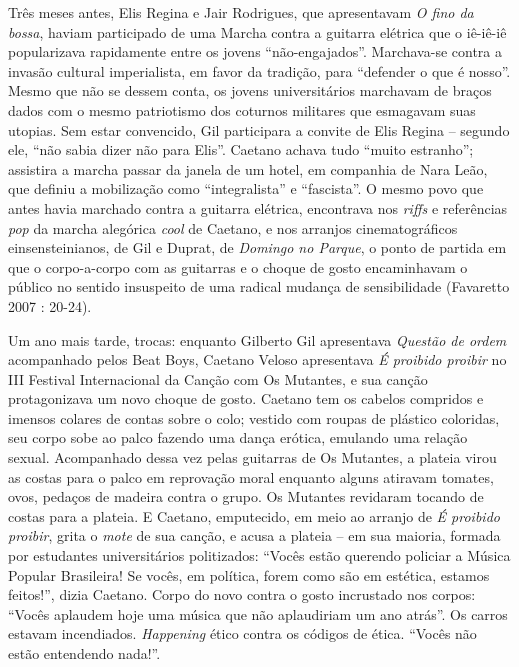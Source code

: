 Três meses antes, Elis Regina e Jair Rodrigues, que apresentavam \emph{O
fino da bossa}, haviam participado de uma Marcha contra a guitarra
elétrica que o iê-iê-iê popularizava rapidamente entre os jovens
``não-engajados''. Marchava-se contra a invasão cultural imperialista,
em favor da tradição, para ``defender o que é nosso''. Mesmo que não se
dessem conta, os jovens universitários marchavam de braços dados com o
mesmo patriotismo dos coturnos militares que esmagavam suas utopias. Sem
estar convencido, Gil participara a convite de Elis Regina -- segundo
ele, ``não sabia dizer não para Elis''. Caetano achava tudo ``muito
estranho''; assistira a marcha passar da janela de um hotel, em
companhia de Nara Leão, que definiu a mobilização como ``integralista''
e ``fascista''. O mesmo povo que antes havia marchado contra a guitarra
elétrica, encontrava nos \emph{riffs }e referências \emph{pop} da marcha
alegórica \emph{cool }de Caetano, e nos arranjos cinematográficos
einsensteinianos, de Gil e Duprat, de \emph{Domingo no Parque},\emph{ }o
ponto de partida em que o corpo-a-corpo com as guitarras e o choque de
gosto encaminhavam o público no sentido insuspeito de uma radical
mudança de sensibilidade (Favaretto 2007 : 20-24).

Um ano mais tarde, trocas: enquanto Gilberto Gil apresentava
\emph{Questão de ordem }acompanhado pelos Beat Boys, Caetano\emph{
}Veloso apresentava \emph{É proibido proibir} no III Festival
Internacional da Canção com Os Mutantes, e sua canção protagonizava um
novo choque de gosto. Caetano tem os cabelos compridos e imensos colares
de contas sobre o colo; vestido com roupas de plástico coloridas, seu
corpo sobe ao palco fazendo uma dança erótica, emulando uma relação
sexual. Acompanhado dessa vez pelas guitarras de Os Mutantes, a plateia
virou as costas para o palco em reprovação moral enquanto alguns
atiravam tomates, ovos, pedaços de madeira contra o grupo. Os Mutantes
revidaram tocando de costas para a plateia. E Caetano, emputecido, em
meio ao arranjo de \emph{É proibido proibir}, grita o \emph{mote }de sua
canção, e acusa a plateia -- em sua maioria, formada por estudantes
universitários politizados: ``Vocês estão querendo policiar a Música
Popular Brasileira! Se vocês, em política, forem como são em estética,
estamos feitos!'', dizia Caetano. Corpo do novo contra o gosto
incrustado nos corpos: ``Vocês aplaudem hoje uma música que não
aplaudiriam um ano atrás''. Os carros estavam incendiados.
\emph{Happening }ético contra os códigos de ética. ``Vocês não estão
entendendo nada!''.

